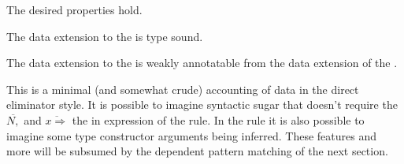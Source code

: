 The desired \bidir{} properties hold.
\begin{claim}
The data extension to the \bidir{} \slang{} is type sound.
\end{claim}

\begin{claim}
The data extension to the \bidir{} \slang{} is weakly annotatable from the data extension of the \slang{}.
\end{claim}

This is a minimal (and somewhat crude) accounting of \bidir{} data in the direct eliminator style.
It is possible to imagine syntactic sugar that doesn't require the $\overline{N,}$ and $\overline{x\Rightarrow}$ the in \case{} expression of the  rule.
In the rule  it is also possible to imagine some type constructor arguments being inferred.
These features and more will be subsumed by the dependent pattern matching of the next section. %

